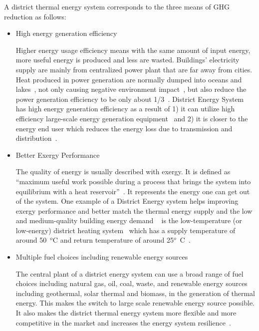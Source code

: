 \documentclass[hidelinks,12pt]{article}
\begin{document}
A district thermal energy system corresponds to the three means of GHG
reduction as follows:
\begin{itemize}
\item High energy generation efficiency

  Higher energy usage efficiency means with the same amount of input
  energy, more useful energy is produced and less are
  wasted. Buildings' electricity supply are mainly from centralized
  power plant that are far away from cities. Heat produced in power
  generation are normally dumped into oceans and
  lakes~\cite{baird2014, IDEA2012}, not only causing negative
  environment impact~\cite{wasteHeatEnviron}, but also reduce the
  power generation efficiency to be only about
  1/3~\cite{IDEA2012}. District Energy System has high energy
  generation efficiency as a result of 1) it can utilize high
  efficiency large-scale energy generation equipment~\cite{IDEA2005}
  and 2) it is closer to the energy end user which reduces the energy
  loss due to transmission and distribution~\cite{IDEA2012}.

\item Better Exergy Performance 

  The quality of energy is usually described with exergy. It is
  defined as ``maximum useful work possible during a process that
  brings the system into equilibrium with a heat
  reservoir''~\cite{exergyWiki2015}. It represents the energy one can
  get out of the system. One example of a District Energy system helps
  improving exergy performance and better match the thermal energy
  supply and the low and medium-quality building energy demand
  ~\cite{Dobbelsteen2013} is the low-temperature (or low-energy)
  district heating system~\cite{Tol2012551} which has a supply
  temperature of around 50~$^o$C and return temperature of around
  25$^o$~C~\cite{Tol2012551}.

\item Multiple fuel choices including renewable energy sources

  The central plant of a district energy system can use a broad range
  of fuel choices including natural gas, oil, coal, waste, and
  renewable energy sources including geothermal, solar thermal and
  biomass, in the generation of thermal energy. This makes the switch
  to large scale renewable energy source possible. It also makes the
  district thermal energy system more flexible and more competitive in
  the market and increases the energy system
  resilience~\cite{IDEA2005, IDEA2012}.

\end{itemize}
\end{document}
